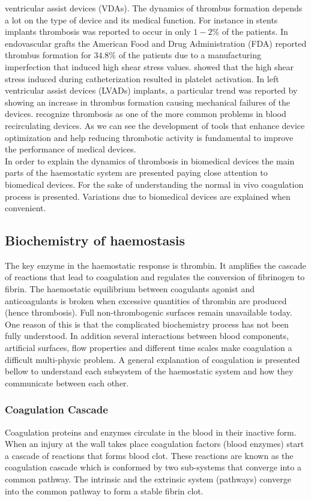 \documentclass[%
 nofootinbib,
 amsmath,amssymb,
 aps,
 pra,
]{revtex4-1}
\begin{document}
ventricular assist devices (VDAs). The dynamics of thrombus formation depends a lot on the type of device and its medical function. For instance in stents implants \citet{Wilson:2013} thrombosis was reported to occur in only $1-2 \%$ of the patients. In endovascular grafts the American %
Food and Drug Administration (FDA) reported thrombus formation for $34.8\%$ of the patients due to a manufacturing imperfection that induced high shear stress values. \citet{Chan:2009} showed that the high shear stress induced during catheterization resulted in platelet activation. In %
left ventricular assist devices (LVADs) implants, a particular trend was reported by \citet{Mehra:2014} showing an increase in thrombus formation causing mechanical failures of the devices. \citet{Bluestein:2010} recognize thrombosis as one of the more common problems in blood recirculating devices. As we can see  the development of tools that enhance device optimization and help reducing thrombotic activity is fundamental to improve the performance of medical devices.\\ 
In order to explain the dynamics of thrombosis in biomedical devices the main parts of the haemostatic system are presented paying close attention to biomedical devices. For the sake of understanding the normal in vivo coagulation process is presented. Variations due to biomedical devices are explained when convenient. 
\subsection{ \label{sec:chemical} Biochemistry of haemostasis}
The key enzyme in the haemostatic response is thrombin. It amplifies the cascade of reactions that lead to coagulation and regulates the conversion of fibrinogen to fibrin. The haemostatic equilibrium between coagulants agonist and anticoagulants is broken when excessive quantities of thrombin are produced (hence thrombosis). Full non-thrombogenic  surfaces remain unavailable today. One reason of this is that the complicated biochemistry process has not been fully understood. In addition several interactions between blood components, artificial surfaces, flow properties and different time scales make coagulation a difficult multi-physic problem. A general explanation of coagulation is presented bellow to understand each subsystem of the haemostatic system and how they communicate between each other.
\subsubsection{Coagulation Cascade}
Coagulation proteins and enzymes circulate in the blood in their inactive form. When an injury at the wall takes place coagulation factors (blood enzymes) start a cascade of reactions that forms blood clot. These reactions are known as the coagulation cascade which is conformed by two sub-systems that converge into a common pathway. The intrinsic and the extrinsic system (pathways) converge into the common pathway to form a stable fibrin clot.\\
\end{document}
